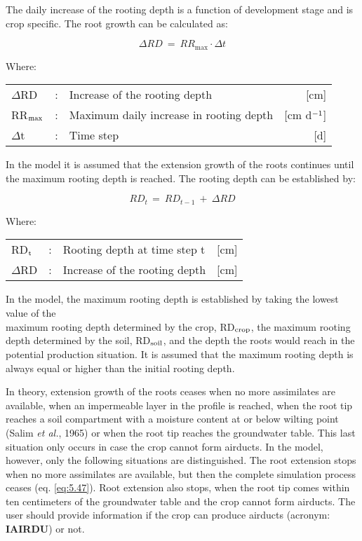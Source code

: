 The daily increase of the rooting depth is a function of development stage and is crop
specific. The root growth can be calculated as:

\begin{equation}
\Delta RD~=~RR_{\max} \cdot \Delta t
\end{equation}

Where:\\[5pt]
\begin{tabularx}{\textwidth}{llXr}
$\Delta$RD &:& Increase of the rooting depth   &   [cm]\\
RR$_{{\rm max}}$ &:& Maximum daily increase in rooting depth  &  [cm d$^{{\rm -}{1}}$]\\
$\Delta$t &:& Time step   &  [d]\\
\end{tabularx}

In the model it is assumed that the extension growth of the roots continues until the
maximum rooting depth is reached. The rooting depth can be established by:

\begin{equation}
RD _{t~} =~RD _{t-1} ~+~\Delta RD
\end{equation}

Where:\\[5pt]
\begin{tabularx}{\textwidth}{llXr}
RD$_{{\rm t}}$ &:& Rooting depth at time step t   &  [cm]\\
$\Delta$RD &:& Increase of the rooting depth    & [cm]\\
\end{tabularx}

In the model, the maximum rooting depth is established by taking the lowest value of the\\
maximum rooting depth determined by the crop, RD$_{{\rm crop}}$, the maximum rooting depth
determined by the soil, RD$_{{\rm soil}}$, and the depth the roots would reach in the potential
production situation. It is assumed that the maximum rooting depth is always equal or
higher than the initial rooting depth.

In theory, extension growth of the roots ceases when no more assimilates are available,
when an impermeable layer in the profile is reached, when the root tip reaches a soil
compartment with a moisture content at or below wilting point (Salim {\it et al.}, 1965) or
when the root tip reaches the groundwater table. This last situation only occurs in case
the crop cannot form airducts. In the model, however, only the following situations are
distinguished. The root extension stops when no more assimilates are available, but then
the complete simulation process ceases (eq. \ref{eq:5.47}). Root extension also stops, when the
root tip comes within ten centimeters of the groundwater table and the crop cannot form
airducts. The user should provide information if the crop can produce airducts (acronym:
{\bf IAIRDU}) or not.

